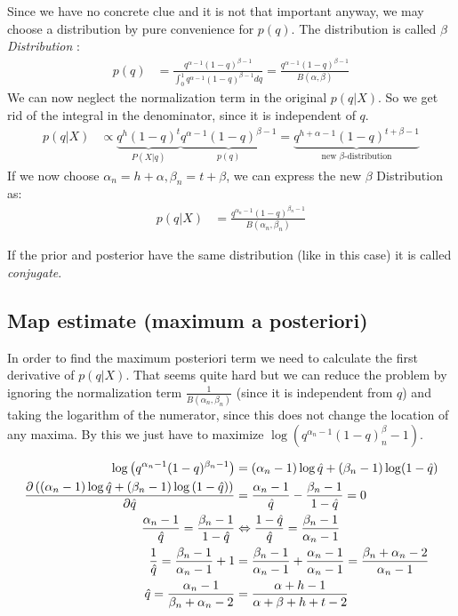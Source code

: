 Since we have no concrete clue and it is not that important anyway, we may choose a distribution by pure convenience for $p(q)$. The distribution is called \textit{$\beta$ Distribution} :
\begin{align*}
p(q) &= \frac{q^{\alpha-1}(1-q)^{\beta-1}}{\int_0^1 q^{\alpha-1}(1-q)^{\beta-1}dq} = \frac{q^{\alpha-1}(1-q)^{\beta-1}}{B(\alpha,\beta)}
\end{align*}
We can now neglect the normalization term in the original $p(q|X)$. So we get rid of the integral in the denominator, since it is independent of $q$.
\begin{align*}
p(q|X) &\propto \underbrace{q^h(1-q)^t}_{P(X|q)} \underbrace{q^{\alpha-1}(1-q)^{\beta-1}}_{p(q)} = \underbrace{q^{h+\alpha-1}(1-q)^{t+\beta-1}}_\text{new $\beta$-distribution}
\end{align*}
If we now choose $\alpha_n = h+\alpha, \beta_n = t+\beta$, we can express the new $\beta$ Distribution as:
\begin{align*}
p(q|X) &= \frac{q^{\alpha_n-1}(1-q)^{\beta_n-1}}{B(\alpha_n, \beta_n)} 
\end{align*}

If the prior and posterior have the same distribution (like in this case) it is called \textit{conjugate}.

\subsection{Map estimate (maximum a posteriori)}
In order to find the maximum posteriori term we need to calculate the first derivative of $p(q|X)$. That seems quite hard but we can reduce the problem by ignoring the normalization term $\frac{1}{B(\alpha_n, \beta_n)}$ (since it is independent from $q$) and taking the logarithm of the numerator, since this does not change the location of any maxima. By this we just have to maximize $\log(q^{\alpha_n-1}(1-q)^\beta_n-1)$.

\begin{align*}
\log{\left(q^{\alpha_n-1}(1-q)^{\beta_n-1}\right)} &= (\alpha_n-1)\log \est{q} + (\beta_n-1)\log (1-\est{q}) \\
\frac{\partial \left(\left(\alpha_n-1\right)\log \est{q} + \left(\beta_n-1\right)\log \left(1-\est{q}\right)\right)}{\partial \est{q}} &= \frac{\alpha_n-1}{\est{q}} - \frac{\beta_n-1}{1-\est{q}} = 0 \\
\frac{\alpha_n-1}{\est{q}} = \frac{\beta_n-1}{1-\est{q}} &\Leftrightarrow \frac{1-\est{q}}{\est{q}} = \frac{\beta_n-1}{\alpha_n-1} \\
\frac{1}{\est{q}} = \frac{\beta_n-1}{\alpha_n-1}+1 &= \frac{\beta_n-1}{\alpha_n-1} + \frac{\alpha_n-1}{\alpha_n-1} = \frac{\beta_n+\alpha_n-2}{\alpha_n-1} \\
\est{q} = \frac{\alpha_n-1}{\beta_n+\alpha_n-2} &= \frac{\alpha+h-1}{\alpha+\beta+h+t-2}
\end{align*}

